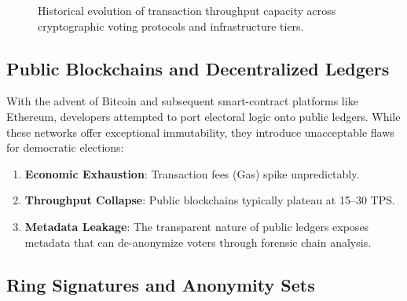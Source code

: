 \documentclass[journal,10pt,twocolumn]{IEEEtran}
\begin{document}
\begin{figure}[htbp]
\centering
{}
\caption{Historical evolution of transaction throughput capacity across cryptographic voting protocols and infrastructure tiers.}
\label{fig:tps_history}
\end{figure}

\subsection{Public Blockchains and Decentralized Ledgers}

With the advent of Bitcoin \cite{b5} and subsequent smart-contract platforms like Ethereum, developers attempted to port electoral logic onto public ledgers. While these networks offer exceptional immutability, they introduce unacceptable flaws for democratic elections:
\begin{enumerate}
    \item \textbf{Economic Exhaustion}: Transaction fees (Gas) spike unpredictably.
    \item \textbf{Throughput Collapse}: Public blockchains typically plateau at 15--30 TPS.
    \item \textbf{Metadata Leakage}: The transparent nature of public ledgers exposes metadata that can de-anonymize voters through forensic chain analysis.
\end{enumerate}

\subsection{Ring Signatures and Anonymity Sets}
\end{document}
